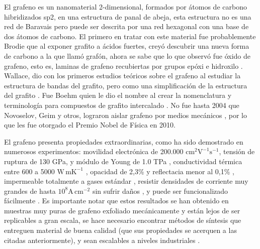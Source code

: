 El grafeno es un nanomaterial 2-dimensional, formados por átomos de carbono  hibridizados sp2, en una estructura de panal de abeja, esta estructura no es una red de Baravais pero puede ser descrita por una red hexagonal con una base de dos átomos de carbono. El primero en tratar con este material fue probablemente Brodie \citep{Brodie1859} que al exponer grafito a ácidos fuertes, creyó descubrir una nueva forma de carbono a la que llamó grafón, ahora se sabe que lo que observó fue óxido de grafeno, esto es, laminas de grafeno recubiertas por grupos epóxi e hidroxilo \citep{Geim2012}. Wallace, dio con los primeros estudios teóricos sobre el grafeno al estudiar la estructura de bandas del grafito, pero como una simplificación de la estructura del grafito \citep{Wallace1947}. Fue Boehm quien le dio el nombre al crear la nomenclatura y terminología para compuestos de grafito intercalado \citep{Boehm1986}. No fue hasta 2004 que Novoselov, Geim y otros, lograron aislar grafeno por medios mecánicos \citep{Novoselov2004}, por lo que les fue otorgado el Premio Nobel de Física en 2010.

El grafeno presenta propiedades extraordinarias, como ha sido demostrado en numerosos experimentos: movilidad electrónica de 200.000 $\mathrm{cm^2 V^{-1} s^{-1} }$\citep{Bolotin2008}, tensión de ruptura de 130 GPa, y módulo de Young de 1.0 TPa \citep{Lee2008}, conductividad térmica entre 600 a 5000 $\mathrm{W\, mK^{-1}}$ \citep{Balandin2011}, opacidad de 2,3\% y reflectacia menor al 0,1\% \citep{Nair2008}, impermeable totalmente a gases estándar \citep{Bunch2007}, resistir densidades de corriente muy grandes de hasta $\mathrm{10^8 A\, cm^{-2}}$ sin sufrir daños  \citep{Moser2007}, y puede ser funcionalizado fácilmente \citep{Loh2010}. Es importante notar que estos resultados se han obtenido en muestras muy puras de grafeno exfoliado mecánicamente \citep{Novoselov2004} y están lejos de ser replicables a gran escala, se hace necesario encontrar métodos de síntesis que entreguen material de buena calidad (que sus propiedades se acerquen a las citadas anteriormente), y sean escalables a niveles industriales \citep{Novoselov2012}.


